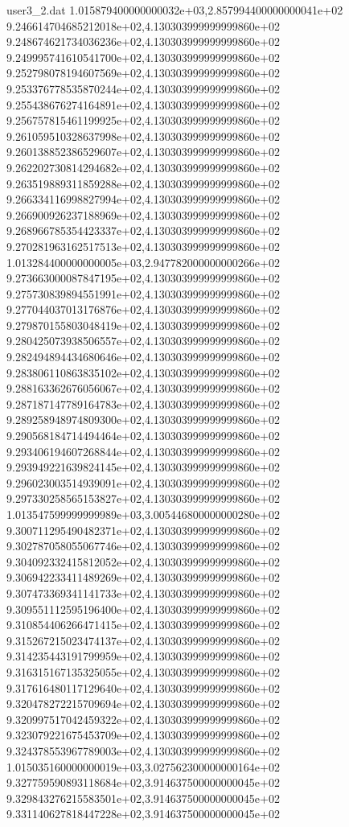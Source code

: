 \begin{filecontents}{user3_2.dat}
1.015879400000000032e+03,2.857994400000000041e+02
9.246614704685212018e+02,4.130303999999999860e+02
9.248674621734036236e+02,4.130303999999999860e+02
9.249995741610541700e+02,4.130303999999999860e+02
9.252798078194607569e+02,4.130303999999999860e+02
9.253376778535870244e+02,4.130303999999999860e+02
9.255438676274164891e+02,4.130303999999999860e+02
9.256757815461199925e+02,4.130303999999999860e+02
9.261059510328637998e+02,4.130303999999999860e+02
9.260138852386529607e+02,4.130303999999999860e+02
9.262202730814294682e+02,4.130303999999999860e+02
9.263519889311859288e+02,4.130303999999999860e+02
9.266334116998827994e+02,4.130303999999999860e+02
9.266900926237188969e+02,4.130303999999999860e+02
9.268966785354423337e+02,4.130303999999999860e+02
9.270281963162517513e+02,4.130303999999999860e+02
1.013284400000000005e+03,2.947782000000000266e+02
9.273663000087847195e+02,4.130303999999999860e+02
9.275730839894551991e+02,4.130303999999999860e+02
9.277044037013176876e+02,4.130303999999999860e+02
9.279870155803048419e+02,4.130303999999999860e+02
9.280425073938506557e+02,4.130303999999999860e+02
9.282494894434680646e+02,4.130303999999999860e+02
9.283806110863835102e+02,4.130303999999999860e+02
9.288163362676056067e+02,4.130303999999999860e+02
9.287187147789164783e+02,4.130303999999999860e+02
9.289258948974809300e+02,4.130303999999999860e+02
9.290568184714494464e+02,4.130303999999999860e+02
9.293406194607268844e+02,4.130303999999999860e+02
9.293949221639824145e+02,4.130303999999999860e+02
9.296023003514939091e+02,4.130303999999999860e+02
9.297330258565153827e+02,4.130303999999999860e+02
1.013547599999999989e+03,3.005446800000000280e+02
9.300711295490482371e+02,4.130303999999999860e+02
9.302787058055067746e+02,4.130303999999999860e+02
9.304092332415812052e+02,4.130303999999999860e+02
9.306942233411489269e+02,4.130303999999999860e+02
9.307473369341141733e+02,4.130303999999999860e+02
9.309551112595196400e+02,4.130303999999999860e+02
9.310854406266471415e+02,4.130303999999999860e+02
9.315267215023474137e+02,4.130303999999999860e+02
9.314235443191799959e+02,4.130303999999999860e+02
9.316315167135325055e+02,4.130303999999999860e+02
9.317616480117129640e+02,4.130303999999999860e+02
9.320478272215709694e+02,4.130303999999999860e+02
9.320997517042459322e+02,4.130303999999999860e+02
9.323079221675453709e+02,4.130303999999999860e+02
9.324378553967789003e+02,4.130303999999999860e+02
1.015035160000000019e+03,3.027562300000000164e+02
9.327759590893118684e+02,3.914637500000000045e+02
9.329843276215583501e+02,3.914637500000000045e+02
9.331140627818447228e+02,3.914637500000000045e+02

\end{filecontents}
